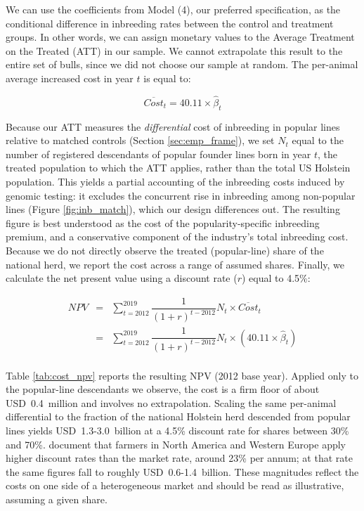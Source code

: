 \documentclass[12pt,letterpaper]{article}
\begin{document}
We can use the coefficients from Model (4), our preferred specification, as the conditional difference in inbreeding rates between the control and treatment groups. In other words, we can assign monetary values to the Average Treatment on the Treated (ATT) in our sample. We cannot extrapolate this result to the entire set of bulls, since we did not choose our sample at random. The per-animal average increased cost in year $t$ is equal to:

\begin{equation}
    \overline{Cost}_{t} = 40.11\times\hat{\beta}_{t}
\end{equation}

Because our ATT measures the \emph{differential} cost of inbreeding in popular lines relative to matched controls (Section \ref{sec:emp_frame}), we set $N_{t}$ equal to the number of registered descendants of popular founder lines born in year $t$, the treated population to which the ATT applies, rather than the total US Holstein population. This yields a partial accounting of the inbreeding costs induced by genomic testing: it excludes the concurrent rise in inbreeding among non-popular lines (Figure \ref{fig:inb_match}), which our design differences out. The resulting figure is best understood as the cost of the popularity-specific inbreeding premium, and a conservative component of the industry's total inbreeding cost. Because we do not directly observe the treated (popular-line) share of the national herd, we report the cost across a range of assumed shares. Finally, we calculate the net present value using a discount rate ($r$) equal to 4.5\%:

\begin{eqnarray*}
NPV &=& \sum_{t = 2012}^{2019}\dfrac{1}{(1+r)^{t-2012}}N_{t}\times \overline{Cost}_{t}\\
&=& \sum_{t = 2012}^{2019}\dfrac{1}{(1+r)^{t-2012}}N_{t}\times\left(40.11\times \hat{\beta}_{t}\right)\\
\end{eqnarray*}

Table \ref{tab:cost_npv} reports the resulting NPV (2012 base year). Applied only to the popular-line descendants we observe, the cost is a firm floor of about USD~0.4~million and involves no extrapolation. Scaling the same per-animal differential to the fraction of the national Holstein herd descended from popular lines yields USD~1.3-3.0~billion at a 4.5\% discount rate for shares between 30\% and 70\%. \cite{Wuepper2023} document that farmers in North America and Western Europe apply higher discount rates than the market rate, around 23\% per annum; at that rate the same figures fall to roughly USD~0.6-1.4~billion. These magnitudes reflect the costs on one side of a heterogeneous market and should be read as illustrative, assuming a given share.
\end{document}
